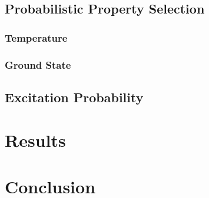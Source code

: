\documentclass[12pt,Bold,letterpaper,TexShade]{mcgilletdclass}
\begin{document}
\section{Probabilistic Property Selection}
\subsection{Temperature}
\subsection{Ground State}
\section{Excitation Probability}


\chapter{Results}

\chapter{Conclusion}

{}

\end{document}
